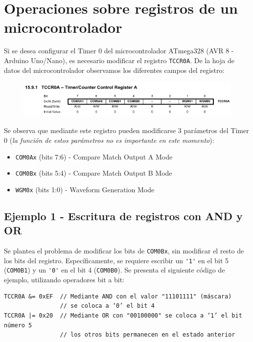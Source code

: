 \documentclass[paper=a4, fontsize=11pt]{scrartcl}	%
\numberwithin{equation}{section} %
\numberwithin{figure}{section} %
\numberwithin{table}{section} %
\begin{document}
\section{Operaciones sobre registros de un microcontrolador}

Si se desea configurar el Timer 0 del microcontrolador ATmega328 (AVR
8 - Arduino Uno/Nano), es necesario modificar el registro \verb|TCCR0A|. De la hoja de datos del
microcontrolador observamos los diferentes campos del registro:

\begin{figure}[h]
  \includegraphics[width=\textwidth]{ATMEGA-timer.png}
\end{figure}

Se observa que mediante este registro pueden modificarse 3 parámetros
del Timer 0 (\emph{la función de estos parámetros no es importante en este
momento}):
\begin{itemize}
  \item \verb|COM0Ax| (bits 7:6) - Compare Match Output A Mode
  \item \verb|COM0Bx| (bits 5:4) - Compare Match Output B Mode
  \item \verb|WGM0x| (bits 1:0) - Waveform Generation Mode
\end{itemize}

\subsection{Ejemplo 1 - Escritura de registros con AND y OR}

Se plantea el problema de modificar los bits de \verb|COM0Bx|, sin
modificar el resto de los bits del registro. Específicamente, se
requiere escribir un \verb|'1'| en el bit 5 (\verb|COM0B1|) y un
\verb|'0'| en el bit 4 (\verb|COM0B0|).  Se presenta el siguiente código
de ejemplo, utilizando operadores {bit a bit}:

\begin{verbatim}
TCCR0A &= 0xEF  // Mediante AND con el valor "11101111" (máscara)
                // se coloca a ‘0’ el bit 4
TCCR0A |= 0x20  // Mediante OR con "00100000" se coloca a ‘1’ el bit número 5
                // los otros bits permanecen en el estado anterior
\end{verbatim}
\end{document}
